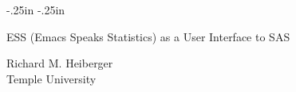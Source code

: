 
\raggedbottom  %

\textwidth 9.5in
\textheight 7in
\oddsidemargin  -.25in
\evensidemargin -.25in
\topmargin -1in
\setlength{\parindent}{0in}

\newcommand*{\Fortran}{\textsc{Fortran}}
\newcommand{\SAS}{{\textsc{SAS}}}
\def\url#1{\texttt{#1}} %


\thispagestyle{empty}
\Huge
\begin{center}
ESS (Emacs Speaks Statistics) as a User Interface to SAS
\vspace*{2ex}

Richard M. Heiberger\\
Temple University
\vspace*{2ex}
\end{center}


